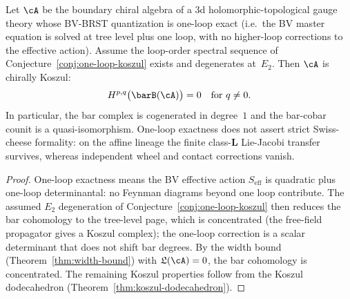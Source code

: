 \begin{theorem}
\label{thm:one-loop-koszul}
Let\/ $\cA$ be the boundary chiral algebra of a 3d
holomorphic-topological gauge theory whose BV-BRST
quantization is one-loop exact \textup{(}i.e.\ the
BV master equation is solved at tree level plus one loop,
with no higher-loop corrections to the effective action\textup{)}.
Assume the loop-order spectral sequence of
Conjecture~\ref{conj:one-loop-koszul} exists and degenerates
at~$E_2$. Then $\cA$ is chirally Koszul:
\[
H^{p,q}\bigl(\barB(\cA)\bigr) = 0 \quad \text{for } q \neq 0.
\]
In particular, the bar complex is cogenerated in degree~$1$ and the
bar-cobar counit is a quasi-isomorphism. One-loop exactness does not
assert strict Swiss-cheese formality: on the affine lineage the finite
class-$\mathbf L$ Lie-Jacobi transfer survives, whereas independent
wheel and contact corrections vanish.
\end{theorem}

\begin{proof}
One-loop exactness means the BV effective action $S_{\mathrm{eff}}$
is quadratic plus one-loop determinantal: no Feynman diagrams
beyond one loop contribute. The assumed $E_2$ degeneration of
Conjecture~\ref{conj:one-loop-koszul} then reduces the bar
cohomology to the tree-level page, which is concentrated (the
free-field propagator gives a Koszul complex); the one-loop
correction is a scalar determinant that does not shift bar
degrees. By the width bound (Theorem~\ref{thm:width-bound})
with $\mathfrak{L}(\cA) = 0$, the bar cohomology is
concentrated. The remaining Koszul properties follow from the
Koszul dodecahedron (Theorem~\ref{thm:koszul-dodecahedron}).
\end{proof}

